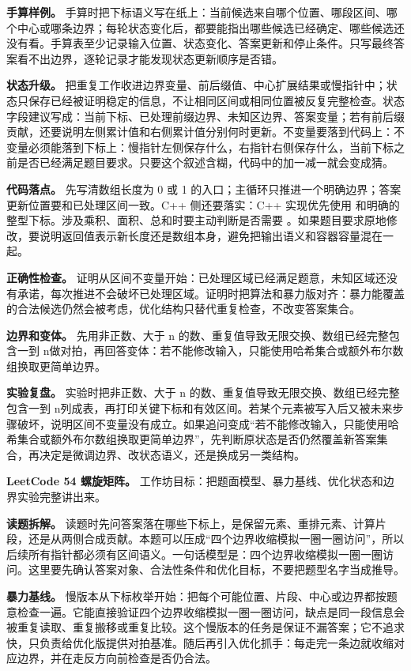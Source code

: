 \textbf{手算样例。} 手算时把下标语义写在纸上：当前候选来自哪个位置、哪段区间、哪个中心或哪条边界；每轮状态变化后，都要能指出哪些候选已经确定、哪些候选还没有看。手算表至少记录输入位置、状态变化、答案更新和停止条件。只写最终答案看不出边界，逐轮记录才能发现状态更新顺序是否错。

\textbf{状态升级。} 把重复工作收进边界变量、前后缀值、中心扩展结果或慢指针中；状态只保存已经被证明稳定的信息，不让相同区间或相同位置被反复完整检查。状态字段建议写成：当前下标、已处理前缀边界、未知区边界、答案变量；若有前后缀贡献，还要说明左侧累计值和右侧累计值分别何时更新。不变量要落到代码上：不变量必须能落到下标上：慢指针左侧保存什么，右指针右侧保存什么，当前下标之前是否已经满足题目要求。只要这个叙述含糊，代码中的加一减一就会变成猜。

\textbf{代码落点。} 先写清数组长度为 0 或 1 的入口；主循环只推进一个明确边界；答案更新位置要和已处理区间一致。C++ 侧还要落实：C++ 实现优先使用  和明确的整型下标。涉及乘积、面积、总和时要主动判断是否需要 。如果题目要求原地修改，要说明返回值表示新长度还是数组本身，避免把输出语义和容器容量混在一起。

\textbf{正确性检查。} 证明从区间不变量开始：已处理区域已经满足题意，未知区域还没有承诺，每次推进不会破坏已处理区域。证明时把算法和暴力版对齐：暴力能覆盖的合法候选仍然会被考虑，优化结构只替代重复检查，不改变答案集合。

\textbf{边界和变体。} 先用非正数、大于 n 的数、重复值导致无限交换、数组已经完整包含一到 n做对拍，再回答变体：若不能修改输入，只能使用哈希集合或额外布尔数组换取更简单边界。

\textbf{实验复盘。} 实验时把非正数、大于 n 的数、重复值导致无限交换、数组已经完整包含一到 n列成表，再打印关键下标和有效区间。若某个元素被写入后又被未来步骤破坏，说明区间不变量没有成立。如果追问变成“若不能修改输入，只能使用哈希集合或额外布尔数组换取更简单边界”，先判断原状态是否仍然覆盖新答案集合，再决定是微调边界、改状态语义，还是换成另一类结构。

\noindent\textbf{LeetCode 54 螺旋矩阵。} 工作坊目标：把题面模型、暴力基线、优化状态和边界实验完整讲出来。

\textbf{读题拆解。} 读题时先问答案落在哪些下标上，是保留元素、重排元素、计算片段，还是从两侧合成贡献。本题可以压成“四个边界收缩模拟一圈一圈访问”，所以后续所有指针都必须有区间语义。一句话模型是：四个边界收缩模拟一圈一圈访问。这里要先确认答案对象、合法性条件和优化目标，不要把题型名字当成推导。

\textbf{暴力基线。} 慢版本从下标枚举开始：把每个可能位置、片段、中心或边界都按题意检查一遍。它能直接验证四个边界收缩模拟一圈一圈访问，缺点是同一段信息会被重复读取、重复搬移或重复比较。这个慢版本的任务是保证不漏答案；它不追求快，只负责给优化版提供对拍基准。随后再引入优化抓手：每走完一条边就收缩对应边界，并在走反方向前检查是否仍合法。

